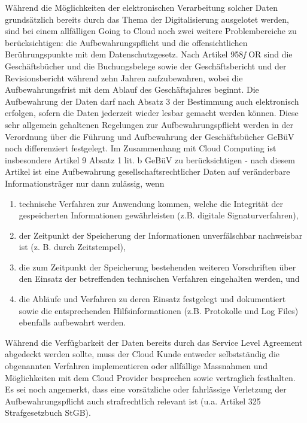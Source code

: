 \documentclass[a4paper,pointlessnumbers]{scrreprt}
\begin{document}
Während die Möglichkeiten der elektronischen Verarbeitung solcher Daten grundsätzlich bereits durch das Thema der Digitalisierung ausgelotet werden, sind bei einem allfälligen Going to Cloud noch zwei weitere Problembereiche zu berücksichtigen: die Aufbewahrungspflicht und die offensichtlichen Berührungspunkte mit dem Datenschutzgesetz. Nach Artikel 958\textit{f} OR sind die Geschäftsbücher und die Buchungsbelege sowie der Geschäftsbericht und der Revisionsbericht während zehn Jahren aufzubewahren, wobei die Aufbewahrungsfrist mit dem Ablauf des Geschäftsjahres beginnt. Die Aufbewahrung der Daten darf nach Absatz 3 der Bestimmung auch elektronisch erfolgen, sofern die Daten jederzeit wieder lesbar gemacht werden können. Diese sehr allgemein gehaltenen Regelungen zur Aufbewahrungspflicht werden in der Verordnung über die Führung und Aufbewahrung der Geschäftsbücher GeBüV noch differenziert festgelegt. Im Zusammenhang mit Cloud Computing ist insbesondere Artikel 9 Absatz 1 lit. b GeBüV zu berücksichtigen - nach diesem Artikel ist eine Aufbewahrung gesellschaftsrechtlicher Daten auf veränderbare Informationsträger nur dann zulässig, wenn
\begin{enumerate}[label=(\arabic*),itemsep=-4pt,after=\vspace*{-2pt}]
\item technische Verfahren zur Anwendung kommen, welche die Integrität der gespeicherten Informationen gewährleisten (z.B. digitale Signaturverfahren),
\item der Zeitpunkt der Speicherung der Informationen unverfälschbar nachweisbar ist (z. B. durch Zeitstempel),
\item die zum Zeitpunkt der Speicherung bestehenden weiteren Vorschriften über den Einsatz der betreffenden technischen Verfahren eingehalten werden, und
\item die Abläufe und Verfahren zu deren Einsatz festgelegt und dokumentiert sowie die entsprechenden Hilfsinformationen (z.B. Protokolle und Log Files) ebenfalls aufbewahrt werden.
\end{enumerate}
Während die Verfügbarkeit der Daten bereits durch das Service Level Agreement abgedeckt werden sollte, muss der Cloud Kunde entweder selbstständig die obgenannten Verfahren implementieren oder allfällige Massnahmen und Möglichkeiten mit dem Cloud Provider besprechen sowie vertraglich festhalten. Es sei noch angemerkt, dass eine vorsätzliche oder fahrlässige Verletzung der Aufbewahrungspflicht auch strafrechtlich relevant ist (u.a. Artikel 325 Strafgesetzbuch StGB).
\end{document}

